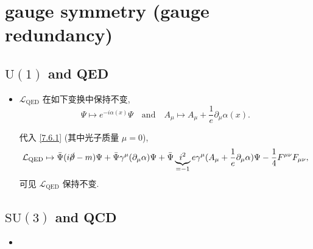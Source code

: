 \chapter{gauge symmetry (gauge redundancy)}
\section{\texorpdfstring{$\mathrm{U}(1)$}{U(1)} and QED}
\begin{itemize}
	\item $\mathcal{L}_\text{QED}$ 在如下变换中保持不变,
	\begin{equation}
		\Psi \mapsto e^{- i \alpha(x)} \Psi \quad \text{and} \quad A_\mu \mapsto A_\mu + \frac{1}{e} \partial_\mu \alpha(x).
	\end{equation}
	
	\begin{tcolorbox}[title=calculation:]
		代入 \eqref{7.6.1} (其中光子质量 $\mu = 0$),
		\begin{equation}
			\mathcal{L}_\text{QED} \mapsto \bar{\Psi} (i \cancel{\partial} - m) \Psi + \bar{\Psi} \gamma^\mu (\partial_\mu \alpha) \Psi + \bar{\Psi} \underbrace{i^2}_{= - 1} e \gamma^\mu (A_\mu + \frac{1}{e} \partial_\mu \alpha) \Psi - \frac{1}{4} F^{\mu \nu} F_{\mu \nu},
		\end{equation}
		可见  $\mathcal{L}_\text{QED}$ 保持不变.
	\end{tcolorbox}
\end{itemize}

\section{\texorpdfstring{$\mathrm{SU}(3)$}{SU(3)} and QCD}
\begin{itemize}
	\item 
\end{itemize}
